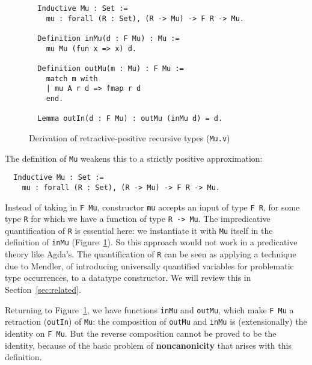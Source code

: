 \documentclass[a4paper,USenglish]{lipics-v2021}
\begin{document}
\begin{figure}
\begin{verbatim}
  Inductive Mu : Set := 
    mu : forall (R : Set), (R -> Mu) -> F R -> Mu.

  Definition inMu(d : F Mu) : Mu :=
    mu Mu (fun x => x) d.

  Definition outMu(m : Mu) : F Mu :=
    match m with
    | mu A r d => fmap r d
    end.

  Lemma outIn(d : F Mu) : outMu (inMu d) = d.
\end{verbatim}
\caption{Derivation of retractive-positive recursive types (\texttt{Mu.v})}
\label{fig:mu}
\end{figure}  


The definition of \verb|Mu| weakens
this to a strictly positive approximation:
\begin{verbatim}
  Inductive Mu : Set := 
    mu : forall (R : Set), (R -> Mu) -> F R -> Mu.
\end{verbatim}
\noindent Instead of taking in \verb|F Mu|, constructor \verb|mu|
accepts an input of type \verb|F R|, for some type \verb|R| for which
we have a function of type \verb|R -> Mu|.  The impredicative
quantification of \verb|R| is essential here: we instantiate it with
\verb|Mu| itself in the definition of \verb|inMu|
(Figure~\ref{fig:mu}).  So this approach would not work in a
predicative theory like Agda's.  The quantification of \verb|R| can be
seen as applying a technique due to Mendler, of introducing
universally quantified variables for problematic type occurrences, to
a datatype constructor.  We will review this in
Section~\ref{sec:related}.

Returning to Figure~\ref{fig:mu}, we have functions \verb|inMu| and
\verb|outMu|, which make \verb|F Mu| a retraction (\verb|outIn|) of
\verb|Mu|: the composition of \verb|outMu| and \verb|inMu| is
(extensionally) the identity on \verb|F Mu|.  But the reverse
composition cannot be proved to be the identity, because of the basic
problem of \textbf{noncanonicity} that arises with this definition.
\end{document}
